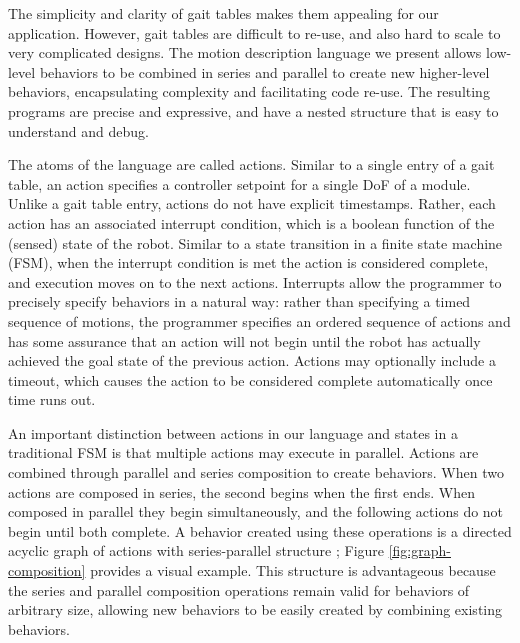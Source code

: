 \documentclass[graybox]{svmult}
\begin{document}
The simplicity and clarity of gait tables makes them appealing for our
application.  However, gait tables are difficult to re-use, and also hard to
scale to very complicated designs. The  motion description language we present
allows low-level behaviors to be combined in series and parallel to create new
higher-level behaviors, encapsulating complexity and facilitating code re-use.
The resulting programs are precise and expressive, and have a nested structure
that is easy to understand and debug.

%    

 The atoms of the language are called actions.  Similar to a single entry of a gait
table, an action specifies a controller setpoint for a single DoF of a module.  Unlike
a gait table entry, actions do not have explicit timestamps.  Rather, each action has an associated
interrupt condition, which is a boolean function of the (sensed) state of the robot. Similar
to a state transition in a finite state machine (FSM), when the interrupt condition is met the action is  considered
complete, and  execution moves on to the next actions.  Interrupts allow the programmer
to precisely specify behaviors in a natural way: rather than specifying a timed sequence
of motions, the programmer specifies an ordered sequence of actions and has some
assurance that an action will not begin until the robot has actually achieved the goal
state of the previous action. Actions
may optionally include a timeout, which causes the action to be considered complete
automatically once time runs out.

An important distinction between actions in our language and states in a traditional
FSM is that multiple actions may execute in parallel.   Actions are combined through
parallel and series composition to create behaviors. When two actions are composed in series,
the second begins when the first ends. When composed in parallel they
begin simultaneously, and the following actions do not begin until both complete.
A behavior created using these operations is a directed acyclic graph of actions with
series-parallel structure \cite{valdes1979recognition};  Figure \ref{fig:graph-composition} provides
a visual example. This structure is advantageous because the
 series and parallel composition operations   
remain valid for behaviors of arbitrary size, allowing new behaviors to be easily
created by combining existing behaviors.
 
\end{document}

